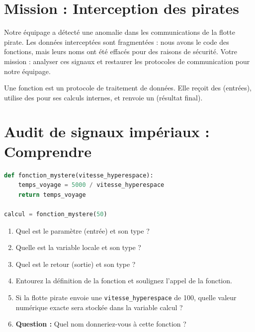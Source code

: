 \section*{Mission : Interception des pirates }
\setcounter{chapter}{1}

Notre équipage a détecté une anomalie dans les communications de la flotte pirate. 
Les données interceptées sont fragmentées : nous avons le code des fonctions, mais leurs noms ont été effacés pour des raisons de sécurité.
Votre mission : analyser ces signaux et restaurer les protocoles de communication pour notre équipage.

\begin{Definition}
Une fonction est un protocole de traitement de données. Elle reçoit des  (entrées), utilise des  pour ses calculs internes, et renvoie un  (résultat final).
\end{Definition}

\section{Audit de signaux impériaux : Comprendre }

\begin{Exercise}[title={Signal Alpha (Simple) }]
\begin{lstlisting}[style=pythonstyle, language=python]
def fonction_mystere(vitesse_hyperespace):
    temps_voyage = 5000 / vitesse_hyperespace
    return temps_voyage

calcul = fonction_mystere(50)
\end{lstlisting}
\begin{enumerate}
    \item Quel est le paramètre (entrée) et son type ?
    \item Quelle est la variable locale et son type ?
    \item Quel est le retour (sortie) et son type ?
    \item Entourez la définition de la fonction et soulignez l'appel de la fonction.
    \item Si la flotte pirate envoie une \texttt{vitesse\_hyperespace} de 100, quelle valeur numérique exacte sera stockée dans la variable calcul ?
    \item \textbf{Question :} Quel nom donneriez-vous à cette fonction ? 
\end{enumerate}
\end{Exercise}

